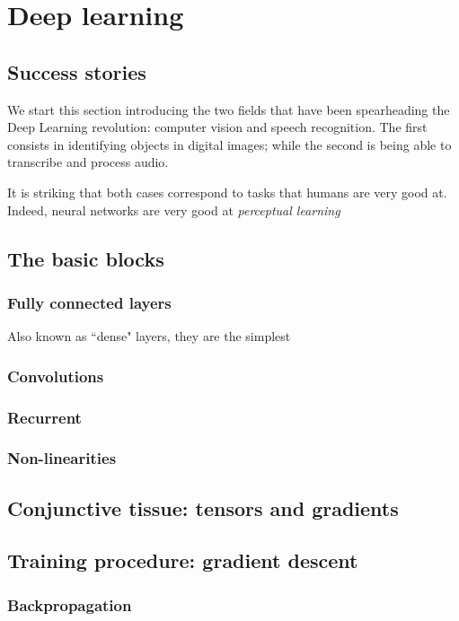 \chapter{Deep learning}
\section{Success stories}
We start this section introducing the two fields that have been spearheading the Deep Learning revolution: computer vision and speech recognition.
The first consists in identifying objects in digital images; while the second is being able to transcribe and process audio.

It is striking that both cases correspond to tasks that humans are very good at.
Indeed, neural networks are very good at \emph{perceptual learning}

\section{The basic blocks}
\subsection{Fully connected layers}
Also known as ``dense" layers, they are the simplest 

\subsection{Convolutions}
\subsection{Recurrent}
\subsection{Non-linearities}

\section{Conjunctive tissue: tensors and gradients}

\section[Gradient descent]{Training procedure: gradient descent}\label{sec:grad_descent}
\subsection{Backpropagation}
